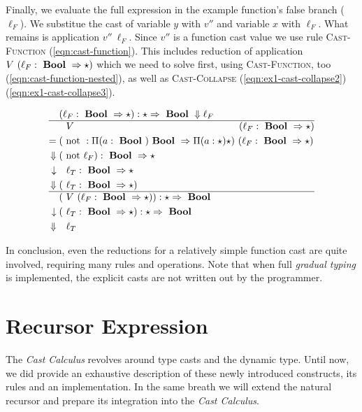Finally, we evaluate the full expression in the example function's false branch ($\ell_F$). We substitue the cast of variable $y$ with $v''$ and variable $x$ with $\ell_F$. What remains is application $v''~\ell_F$. Since $v''$ is a function cast value we use rule \textsc{Cast-Function} (\ref{eqn:cast-function}). This includes reduction of application $V~(\ell_F : \text{ \textbf{Bool} } \Rightarrow \star)$ which we need to solve first, using \textsc{Cast-Function}, too (\ref{eqn:cast-function-nested}), as well as \textsc{Cast-Collapse} (\ref{eqn:ex1-cast-collapse2}) (\ref{eqn:ex1-cast-collapse3}).

\begin{align}
(&\ell_F : \Bool \Rightarrow \star) : \star \Rightarrow \Bool \Downarrow \ell_F \label{eqn:ex1-cast-collapse2} \\ \hline
&~V~ \hspace{16.6em} (\ell_F : \Bool \Rightarrow \star) \\
= ( &\notf : \Pi(a:\Bool) \Bool \Rightarrow \Pi(a:\star) \star)~(\ell_F : \Bool \Rightarrow \star) \\
\Downarrow ( &\notf \ell_F ) : \Bool \Rightarrow \star \\
\downarrow ~~&~\ell_T : \Bool \Rightarrow \star \label{eqn:cast-function-nested} \\
\Downarrow (&~\ell_T : \Bool \Rightarrow \star) \\ \hline
( & ~V~(\ell_F : \Bool \Rightarrow \star)) : \star \Rightarrow \Bool \\
\downarrow (&~\ell_T : \Bool \Rightarrow \star) : \star \Rightarrow \Bool \label{eqn:cast-function} \\
\Downarrow ~~ & ~\ell_T \label{eqn:ex1-cast-collapse3}
\end{align}

In conclusion, even the reductions for a relatively simple function cast are quite involved, requiring many rules and operations. Note that when full \emph{gradual typing} is implemented, the explicit casts are not written out by the programmer.

\section{Recursor Expression}

The \emph{Cast Calculus} revolves around type casts and the dynamic type. Until now, we did provide an exhaustive description of these newly introduced constructs, its rules and an implementation. In the same breath we will extend the natural recursor and prepare its integration into the \emph{Cast Calculus}.

